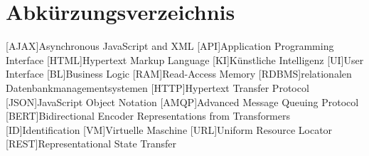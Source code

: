 \section*{Abkürzungsverzeichnis}
\begin{acronym}
	[AJAX]{Asynchronous JavaScript and XML}
	[API]{Application Programming Interface}
	[HTML]{Hypertext Markup Language}
	[KI]{Künstliche Intelligenz}
	[UI]{User Interface}
	[BL]{Business Logic}
	[RAM]{Read-Access Memory}
	[RDBMS]{relationalen Datenbankmanagementsystemen}
	[HTTP]{Hypertext Transfer Protocol}
	[JSON]{JavaScript Object Notation}
	[AMQP]{Advanced Message Queuing Protocol}
	[BERT]{Bidirectional Encoder Representations from Transformers}
	[ID]{Identification}
	[VM]{Virtuelle Maschine}
	[URL]{Uniform Resource Locator}
	[REST]{Representational State Transfer}
\end{acronym}
